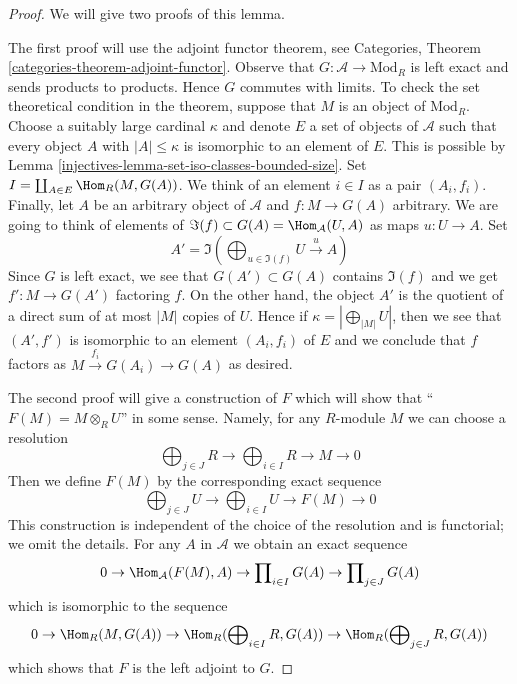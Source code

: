 \begin{proof}

We will give two proofs of this lemma.

\medskip\noindent
The first proof will use the adjoint functor theorem, see
Categories, Theorem \ref{categories-theorem-adjoint-functor}.
Observe that $G : \mathcal{A} \to \text{Mod}_R$ is left exact and sends
products to products. Hence $G$ commutes with limits. To check the set
theoretical condition in the theorem, suppose that $M$ is an object of
$\text{Mod}_R$. Choose a suitably large cardinal $\kappa$ and denote $E$
a set of objects of $\mathcal{A}$ such that every object $A$ with
$|A| \leq \kappa$ is isomorphic to an element of $E$. This is possible
by Lemma \ref{injectives-lemma-set-iso-classes-bounded-size}. Set
$I = \coprod_{A \in E} \Hom_R(M, G(A))$.
We think of an element $i \in I$ as a pair $(A_i, f_i)$.
Finally, let $A$ be an arbitrary object of $\mathcal{A}$
and $f : M \to G(A)$ arbitrary. We are going to think of
elements of $\Im(f) \subset G(A) = \Hom_\mathcal{A}(U, A)$
as maps $u : U \to A$. Set
$$
A' = \Im(\bigoplus\nolimits_{u \in \Im(f)} U \xrightarrow{u} A)
$$
Since $G$ is left exact, we see that $G(A') \subset G(A)$
contains $\Im(f)$ and we get $f' : M \to G(A')$ factoring $f$.
On the other hand, the object $A'$ is
the quotient of a direct sum of at most $|M|$ copies of $U$.
Hence if $\kappa = |\bigoplus_{|M|} U|$, then we see that $(A', f')$
is isomorphic to an element $(A_i, f_i)$ of $E$ and we conclude that $f$
factors as $M \xrightarrow{f_i} G(A_i) \to G(A)$ as desired.

\medskip\noindent
The second proof will give a construction of $F$ which will show
that ``$F(M) = M \otimes_R U$'' in some sense. Namely, for any
$R$-module $M$ we can choose a resolution
$$
\bigoplus\nolimits_{j \in J} R \to
\bigoplus\nolimits_{i \in I} R \to
M \to 0
$$
Then we define $F(M)$ by the corresponding exact sequence
$$
\bigoplus\nolimits_{j \in J} U \to
\bigoplus\nolimits_{i \in I} U \to
F(M) \to 0
$$
This construction is independent of the choice of the resolution
and is functorial; we omit the details.
For any $A$ in $\mathcal{A}$ we obtain an exact sequence
$$
0 \to \Hom_\mathcal{A}(F(M), A) \to
\prod\nolimits_{i \in I} G(A) \to
\prod\nolimits_{j \in J} G(A)
$$
which is isomorphic to the sequence
$$
0 \to \Hom_R(M, G(A)) \to
\Hom_R(\bigoplus\nolimits_{i \in I} R, G(A)) \to
\Hom_R(\bigoplus\nolimits_{j \in J} R, G(A))
$$
which shows that $F$ is the left adjoint to $G$.
\end{proof}


